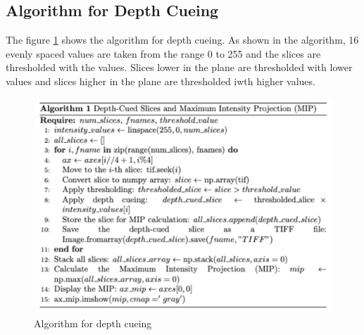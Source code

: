 \documentclass{article}
\begin{document}
\subsection*{Algorithm for Depth Cueing}
The figure \ref{fig:depth-cuing} shows the algorithm for depth cueing. As shown in the algorithm, 16 evenly spaced values are taken from the range 0 to 255 and the slices are thresholded with the values. Slices lower in the plane are thresholded with lower values and slices higher in the plane are thresholded iwth higher values. %
\begin{figure}[h!]
    \centering
    \includegraphics[width=0.8\linewidth]{Report/Images/depth_cuing.png}
    \caption{Algorithm for depth cueing }
    \label{fig:depth-cuing}
\end{figure}
\end{document}
